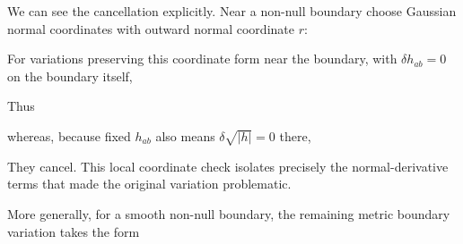 \documentclass[
  11pt,
  letterpaper,
  oneside,
  openany]{scrbook}
\begin{document}
We can see the cancellation explicitly. Near a non-null boundary choose
Gaussian normal coordinates with outward normal coordinate \(r\):

\begin{center}
\begingroup
{}
\ifdim\wd\grmathbox>\linewidth
\resizebox{\linewidth}{!}{\usebox{\grmathbox}}
\else\usebox{\grmathbox}\fi
\endgroup
\end{center}

For variations preserving this coordinate form near the boundary, with
\(\delta h_{ab}=0\) on the boundary itself,

\begin{center}
\begingroup
{}
\ifdim\wd\grmathbox>\linewidth
\resizebox{\linewidth}{!}{\usebox{\grmathbox}}
\else\usebox{\grmathbox}\fi
\endgroup
\end{center}

Thus

\begin{center}
\begingroup
{}
\ifdim\wd\grmathbox>\linewidth
\resizebox{\linewidth}{!}{\usebox{\grmathbox}}
\else\usebox{\grmathbox}\fi
\endgroup
\end{center}

whereas, because fixed \(h_{ab}\) also means \(\delta\sqrt{|h|}=0\)
there,

\begin{center}
\begingroup
{}
\ifdim\wd\grmathbox>\linewidth
\resizebox{\linewidth}{!}{\usebox{\grmathbox}}
\else\usebox{\grmathbox}\fi
\endgroup
\end{center}

They cancel. This local coordinate check isolates precisely the
normal-derivative terms that made the original variation problematic.

More generally, for a smooth non-null boundary, the remaining metric
boundary variation takes the form
\end{document}
